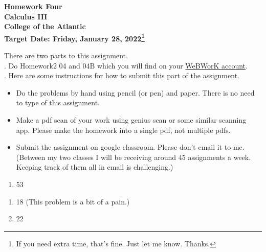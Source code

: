 \documentclass[12pt]{article}
\begin{document}
\pagestyle{empty}
 
\begin{center}
{\LARGE {\bf Homework Four}}\\
\bigskip
{\Large {\bf Calculus III}}\\
\bigskip
{\Large {\bf College of the Atlantic}}\\
\bigskip
{ {\bf Target Date: Friday, January 28, 2022\footnote{If you need extra time,
      that's fine. Just let me know. Thanks.}}}\\  
\end{center}
\medskip


\noindent There are two parts to this assignment.\\

.  Do Homework2 04 and 04B which you will find 
on your \href{https://webwork.runestone.academy/webwork2/coa-feldman-es3028m-winter-2022/}{WeBWorK account}.\\


.  Here are some
instructions for how to submit this part of the assignment.
\begin{itemize}
\item Do the problems by hand using pencil (or pen) and paper.
  There is no need to type of this assignment.
\item Make a pdf scan of your work using genius scan or some
  similar scanning app.  Please make the homework into a single
  pdf, not multiple pdfs.
\item Submit the assignment on google classroom.  Please don't
  email it to me.  (Between my two classes I will be receiving
  around 45 assignments a week.  Keeping track of them all in email 
  is challenging.)
\end{itemize}


\begin{enumerate}
\setlength{\itemsep}{-1mm}
\item 53
\end{enumerate}


\begin{enumerate}
\setlength{\itemsep}{-1mm}
\item 18 (This problem is a bit of a pain.)
\item 22
\end{enumerate}
\end{document}
